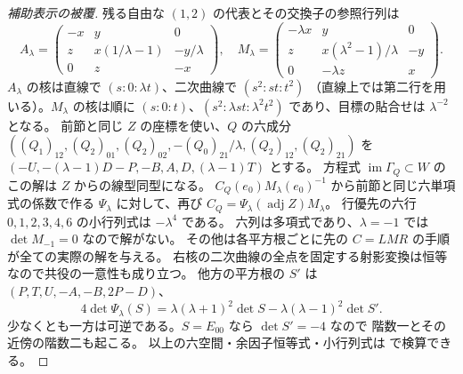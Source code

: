 \begin{proof}[補助表示の被覆]
残る自由な $(1,2)$ の代表とその交換子の参照行列は
\[
 A_\lambda=\begin{pmatrix}-x&y&0\\z&x(1/\lambda-1)&-y/\lambda\\0&z&-x\end{pmatrix},
 \quad M_\lambda=\begin{pmatrix}-\lambda x&y&0\\z&x(\lambda^2-1)/\lambda&-y\\0&-\lambda z&x\end{pmatrix}.
\]
$A_\lambda$ の核は直線で $(s:0:\lambda t)$、二次曲線で $(s^2:st:t^2)$
（直線上では第二行を用いる）。$M_\lambda$ の核は順に
$(s:0:t)$、$(s^2:\lambda st:\lambda^2t^2)$ であり、目標の貼合せは $\lambda^{-2}$ となる。
前節と同じ $Z$ の座標を使い、$Q$ の六成分
$((Q_1)_{12},(Q_2)_{01},(Q_2)_{02},-(Q_0)_{21}/\lambda,(Q_2)_{12},(Q_2)_{21})$ を
$(-U,-(\lambda-1)D-P,-B,A,D,(\lambda-1)T)$ とする。
方程式 $\operatorname{im}\Gamma_Q\subset W$ のこの解は $Z$ からの線型同型になる。
$C_Q(e_0)M_\lambda(e_0)^{-1}$ から前節と同じ六単項式の係数で作る
$\Psi_\lambda$ に対して、再び $C_Q=\Psi_\lambda(\operatorname{adj}Z)M_\lambda$。
行優先の六行 $0,1,2,3,4,6$ の小行列式は $-\lambda^4$ である。
六列は多項式であり、$\lambda=-1$ では $\det M_{-1}=0$ なので解がない。
その他は各平方根ごとに先の $C=L M R$ の手順が全ての実際の解を与える。
右核の二次曲線の全点を固定する射影変換は恒等なので共役の一意性も成り立つ。
他方の平方根の $S'$ は $(P,T,U,-A,-B,2P-D)$、
\[
      4\det\Psi_\lambda(S)=\lambda(\lambda+1)^2\det S-
                                   \lambda(\lambda-1)^2\det S' .
\]
少なくとも一方は可逆である。$S=E_{00}$ なら $\det S'=-4$ なので
階数一とその近傍の階数二も起こる。
以上の六空間・余因子恒等式・小行列式は
 で検算できる。
\end{proof}

